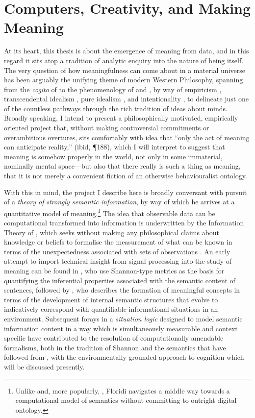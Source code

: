 \section{Computers, Creativity, and Making Meaning}
At its heart, this thesis is about the emergence of meaning from data, and in this regard it sits atop a tradition of analytic enquiry into the nature of being itself.  The very question of how meaningfulness can come about in a material universe has been arguably the unifying theme of modern Western Philosophy, spanning from the \emph{cogito} of \cite{Descartes1911} to the phenomenology of \cite{Husserl1900} and \cite{Heidegger1926}, by way of empiricism \citep{Locke1689,Hume1738}, transcendental idealism \citep{Kant1787}, pure idealism \citep{Hegel1816}, and intentionality \citep{Brentano1874}, to delineate just one of the countless pathways through the rich tradition of ideas about minds.  Broadly speaking, I intend to present a philosophically motivated, empirically oriented project that, without making controversial commitments or overambitious overtures, sits comfortably with  idea that ``only the act of meaning can anticipate reality,'' (ibid, \P 188), which I will interpret to suggest that meaning is somehow properly in the world, not only in some immaterial, nominally mental space---but also that there really is such a thing as meaning, that it is not merely a convenient fiction of an otherwise behaviouralist ontology.

With this in mind, the project I describe here is broadly conversant with  pursuit of a \emph{theory of strongly semantic information}, by way of which he arrives at a quantitative model of meaning.\footnote{Unlike \cite{Fredkin2003} and, more popularly, \cite{Bostrom2014}, Floridi navigates a middle way towards a computational model of semantics without committing to outright digital ontology.}  The idea that observable data can be computational transformed into information is underwritten by the Information Theory of \cite{ShannonEA1949}, which seeks without making any philosophical claims about knowledge or beliefs to formalise the measurement of what can be known in terms of the unexpectedness associated with sets of observations .  An early attempt to import technical insight from signal processing into the study of meaning can be found in , who use Shannon-type metrics as the basis for quantifying the inferential properties associated with the semantic content of sentences, followed by \cite{Dretske1981}, who describes the formation of meaningful concepts in terms of the development of internal semantic structures that evolve to indicatively correspond with quantifiable informational situations in an environment.  Subsequent forays in a \emph{situation logic} designed to model semantic information content in a way which is simultaneously measurable and context specific \citep{BarwiseEA1983} have contributed to the resolution of computationally amendable formalisms, both in the tradition of Shannon and the semantics that have followed from \cite{Montague1974}, with the environmentally grounded approach to cognition which will be discussed presently.

